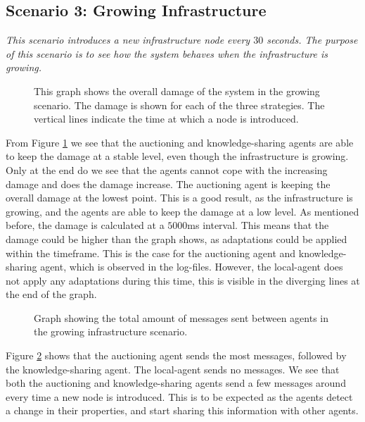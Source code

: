 \subsection{Scenario 3: Growing Infrastructure}
\textit{This scenario introduces a new infrastructure node every $30$ seconds. The purpose of this scenario is to see how the system behaves when the infrastructure is growing.}

\begin{figure}[H]
    \centering
    
    \caption{This graph shows the overall damage of the system in the growing scenario. The damage is shown for each of the three strategies. The vertical lines indicate the time at which a node is introduced.}
    \label{fig:overall-damage-growing}
\end{figure}

From Figure \ref{fig:overall-damage-growing} we see that the auctioning and knowledge-sharing agents are able to keep the damage at a stable level, even though the infrastructure is growing. Only at the end do we see that the agents cannot cope with the increasing damage and does the damage increase. The auctioning agent is keeping the overall damage at the lowest point. This is a good result, as the infrastructure is growing, and the agents are able to keep the damage at a low level. 
As mentioned before, the damage is calculated at a $5000$ms interval. This means that the damage could be higher than the graph shows, as adaptations could be applied within the timeframe. This is the case for the auctioning agent and knowledge-sharing agent, which is observed in the log-files. However, the local-agent does not apply any adaptations during this time, this is visible in the diverging lines at the end of the graph.
 
\begin{figure}[H]
    \centering
    
    \caption{Graph showing the total amount of messages sent between agents in the growing infrastructure scenario.}
    \label{fig:messages-growing}
\end{figure}

Figure \ref{fig:messages-growing} shows that the auctioning agent sends the most messages, followed by the knowledge-sharing agent. The local-agent sends no messages. We see that both the auctioning and knowledge-sharing agents send a few messages around every time a new node is introduced. This is to be expected as the agents detect a change in their properties, and start sharing this information with other agents.

